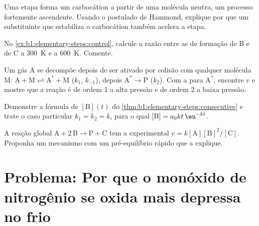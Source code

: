 \begin{exercise}[$\star\star$]\label{exo:b1:elementary-steps:8}
Uma etapa forma um carbocátion a partir de uma molécula neutra, um
processo fortemente ascendente. Usando o postulado de Hammond, explique
por que um substituinte que estabiliza o carbocátion também acelera a
etapa.
\end{exercise}

\begin{exercise}[$\star\star$]\label{exo:b1:elementary-steps:9}
No \cref{ex:b1:elementary-steps:control}, calcule a razão entre as
 de formação de B e de C a \qty{300}{K} e a
\qty{600}{K}. Comente.
\end{exercise}

\begin{exercise}[$\star\star\star$]\label{exo:b1:elementary-steps:10}
Um gás $\mathrm{A}$ se decompõe depois de ser ativado por colisão com
qualquer molécula $\mathrm{M}$: $\mathrm{A} + \mathrm{M} \rightleftharpoons
\mathrm{A}^* + \mathrm{M}$ ($k_1$, $k_{-1}$), depois $\mathrm{A}^* \to
\mathrm{P}$ ($k_2$). Com a  para
$\mathrm{A}^*$, encontre $v$ e mostre que a reação é de ordem 1 a alta
pressão e de ordem 2 a baixa pressão.
\end{exercise}

\begin{exercise}[$\star\star\star$]\label{exo:b1:elementary-steps:11}
Demonstre a fórmula de $[\mathrm{B}](t)$ do
\cref{thm:b1:elementary-steps:consecutive} e trate o caso particular
$k_1 = k_2 = k$, para o qual $[\mathrm{B}] = a_0kt\,\eu^{-kt}$.
\end{exercise}

\begin{exercise}[$\star\star\star$]\label{exo:b1:elementary-steps:12}
A reação global $\mathrm{A} + 2\,\mathrm{B} \to \mathrm{P} +
\mathrm{C}$ tem a  experimental $v =
k[\mathrm{A}][\mathrm{B}]^2/[\mathrm{C}]$. Proponha um mecanismo com um
pré-equilíbrio rápido que a explique.
\end{exercise}

\section{Problema: Por que o monóxido de nitrogênio se oxida mais depressa no frio}


